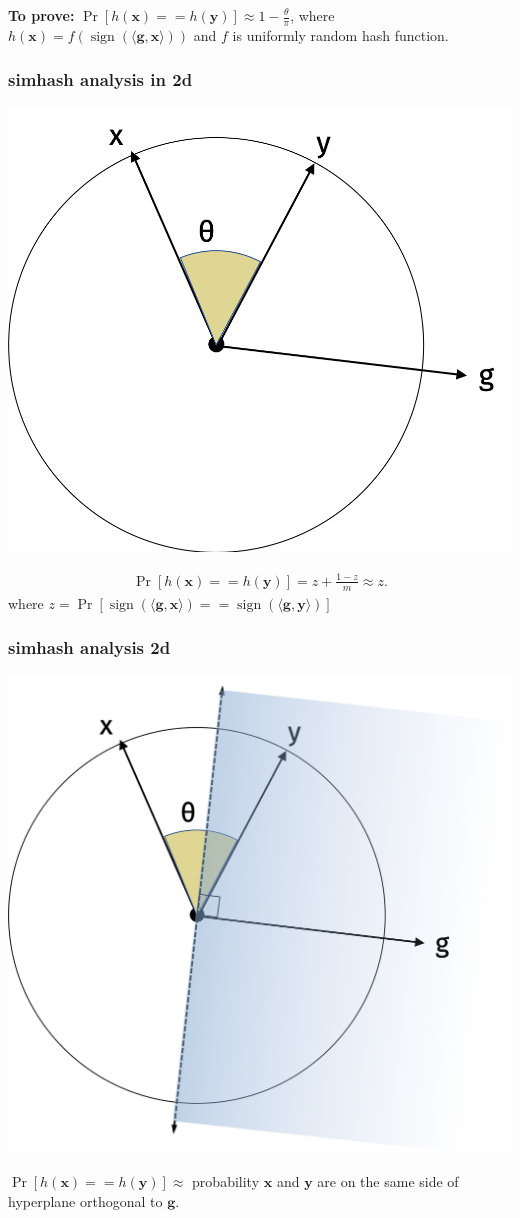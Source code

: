 \documentclass[compress]{beamer}
\newcommand{\bv}[1]{\mathbf{#1}}
\DeclareMathOperator{\sign}{sign}
\begin{document}
\begin{frame}
	\textbf{To prove:}  $\Pr[h(\bv{x}) == h(\bv{y})] \approx 1 - \frac{\theta}{\pi}$,  where $h(\bv{x}) = f\left(\sign(\langle \bv{g}, \bv{x} \rangle)\right)$ and $f$ is uniformly random hash function.
	\frametitle{simhash analysis in 2d}
	\vspace{-.5em}
	\begin{center}
		\includegraphics[width=.5\textwidth]{simhash1.png}
	\end{center}
\begin{align*}
	\Pr[h(\bv{x}) == h(\bv{y})] = z + \frac{1-z}{m} \approx z.
\end{align*}
where $z = \Pr[\sign(\langle \bv{g}, \bv{x} \rangle) == \sign(\langle \bv{g}, \bv{y} \rangle)]$
\end{frame}

\begin{frame}
	\frametitle{simhash analysis 2d}
	\vspace{-.5em}
	\begin{center}
		\includegraphics[width=.55\textwidth]{simhash2.png}
	\end{center}
\vspace{-.5em}
$\Pr[h(\bv{x}) == h(\bv{y})] \approx$ probability $\bv{x}$ and $\bv{y}$ are on the same side of hyperplane orthogonal to $\bv{g}$.
\end{frame}
\end{document}
